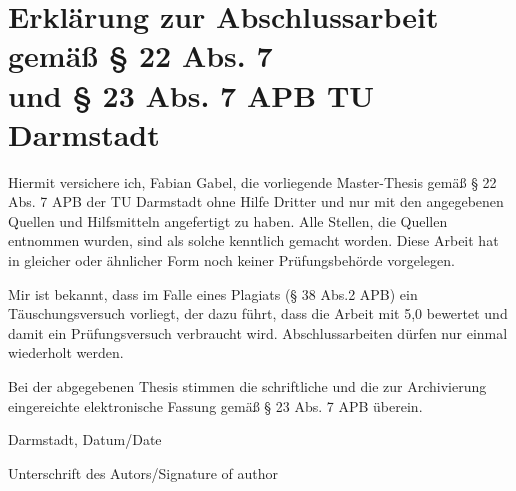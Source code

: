 \thispagestyle{empty}
\section*{Erklärung zur Abschlussarbeit gemäß § 22 Abs. 7 \\und § 23 Abs. 7 APB TU Darmstadt}

Hiermit versichere ich, Fabian Gabel, die vorliegende Master-Thesis gemäß § 22 Abs. 7 APB der TU Darmstadt ohne Hilfe Dritter und nur mit den angegebenen Quellen und Hilfsmitteln angefertigt zu haben. Alle Stellen, die Quellen entnommen wurden, sind als solche kenntlich gemacht worden. Diese Arbeit hat in gleicher oder ähnlicher Form noch keiner Prüfungsbehörde vorgelegen. 

Mir ist bekannt, dass im Falle eines Plagiats (§ 38 Abs.2 APB) ein Täuschungsversuch vorliegt, der dazu führt, dass die Arbeit mit 5,0 bewertet und damit ein Prüfungsversuch verbraucht wird. Abschlussarbeiten dürfen nur einmal wiederholt werden.

Bei der abgegebenen Thesis stimmen die schriftliche und die zur Archivierung eingereichte elektronische Fassung gemäß § 23 Abs. 7 APB überein.

%
%
%
\vspace{20pt}


\noindent
Darmstadt, Datum/Date\vspace{30pt}


\noindent
Unterschrift des Autors/Signature of author
